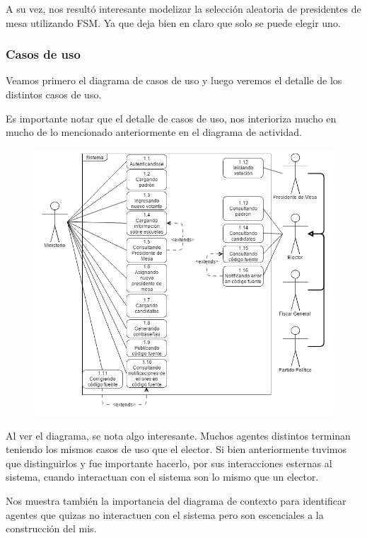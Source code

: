 A su vez, nos resultó interesante modelizar la selección aleatoria de presidentes de mesa utilizando FSM. Ya que deja bien en claro que solo se puede elegir uno.

\subsubsection{Casos de uso}

Veamos primero el diagrama de casos de uso y luego veremos el detalle de los distintos casos de uso.


Es importante notar que el detalle de casos de uso, nos interioriza mucho en mucho de lo mencionado anteriormente en el diagrama de actividad. 


\begin{figure}[h!]
\centering
\includegraphics[scale=0.45]{imagenes/CU/casosdeusopreparacion}
\end{figure}

Al ver el diagrama, se nota algo interesante. Muchos agentes distintos terminan teniendo los mismos casos de uso que el elector. Si bien anteriormente tuvimos que distinguirlos y fue importante hacerlo, por sus interacciones esternas al sistema, cuando interactuan con el sistema son lo mismo que un elector.

Nos muestra también la importancia del diagrama de contexto para identificar agentes que quizas no interactuen con el sistema pero son escenciales a la construcción del mis.

